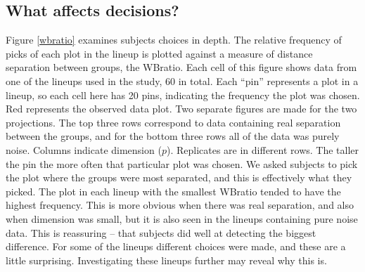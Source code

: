 
\subsection{What affects decisions?}

\normalsize

Figure \ref{wbratio} examines subjects choices in depth. The relative frequency of picks of each plot in the lineup is plotted against a measure of distance separation between groups, the WBratio. %
 Each cell of this figure shows data from one of the lineups used in the study, 60 in total. Each ``pin'' represents a plot in a lineup, so each cell here has 20 pins, indicating the frequency the plot was chosen. Red represents the observed data plot. Two separate figures are made for the two projections. The top three rows correspond to data containing real separation between the groups, and for the bottom three rows all of the data was purely noise. Columns indicate dimension ($p$). Replicates are in different rows. The taller the pin the more often that particular plot was chosen. We asked subjects to pick the plot where the groups were most separated, and this is effectively what they picked. The plot in each lineup with the smallest WBratio tended to have the highest frequency. This is more obvious when there was real separation, and also when dimension was small, but it is also seen in the lineups containing pure noise data. This is reassuring -- that subjects did well at detecting the biggest difference.  For some of the lineups different choices were made, and these are a little surprising. Investigating these lineups further may reveal why this is. 


